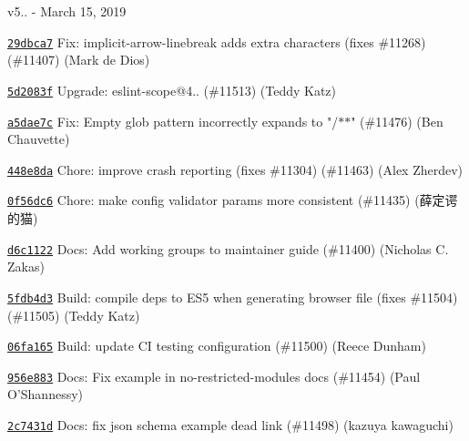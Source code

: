 v5.. -\/ March 15, 2019


\begin{DoxyItemize}
\item \href{https://github.com/eslint/eslint/commit/29dbca73d762a809adb2f457b527e144426d54a7}{\texttt{ {\ttfamily 29dbca7}}} Fix\+: implicit-\/arrow-\/linebreak adds extra characters (fixes \#11268) (\#11407) (Mark de Dios)
\item \href{https://github.com/eslint/eslint/commit/5d2083fa3e14c024197f6c386ff72237a145e258}{\texttt{ {\ttfamily 5d2083f}}} Upgrade\+: eslint-\/scope@4.. (\#11513) (Teddy Katz)
\item \href{https://github.com/eslint/eslint/commit/a5dae7c3d30231c2f5f075d98c2c8825899bab16}{\texttt{ {\ttfamily a5dae7c}}} Fix\+: Empty glob pattern incorrectly expands to "{}/\texorpdfstring{$\ast$}{*}\texorpdfstring{$\ast$}{*}"{} (\#11476) (Ben Chauvette)
\item \href{https://github.com/eslint/eslint/commit/448e8da94d09b397e98ffcb6f22b55a578ef79c1}{\texttt{ {\ttfamily 448e8da}}} Chore\+: improve crash reporting (fixes \#11304) (\#11463) (Alex Zherdev)
\item \href{https://github.com/eslint/eslint/commit/0f56dc6d9eadad05dc3d5c9d1d9ddef94e10c5d3}{\texttt{ {\ttfamily 0f56dc6}}} Chore\+: make config validator params more consistent (\#11435) (薛定谔的猫)
\item \href{https://github.com/eslint/eslint/commit/d6c112289f0f16ade070865c8786831b7940ca79}{\texttt{ {\ttfamily d6c1122}}} Docs\+: Add working groups to maintainer guide (\#11400) (Nicholas C. Zakas)
\item \href{https://github.com/eslint/eslint/commit/5fdb4d3fb01b9d8a4c2dff71ed9cddb2f8feefb0}{\texttt{ {\ttfamily 5fdb4d3}}} Build\+: compile deps to ES5 when generating browser file (fixes \#11504) (\#11505) (Teddy Katz)
\item \href{https://github.com/eslint/eslint/commit/06fa1655c3da8394ed9144d727115fc434b0416f}{\texttt{ {\ttfamily 06fa165}}} Build\+: update CI testing configuration (\#11500) (Reece Dunham)
\item \href{https://github.com/eslint/eslint/commit/956e883c21fd9f393bf6718d032a4e2e53b33f22}{\texttt{ {\ttfamily 956e883}}} Docs\+: Fix example in no-\/restricted-\/modules docs (\#11454) (Paul O’\+Shannessy)
\item \href{https://github.com/eslint/eslint/commit/2c7431d6b32063f74e3837ee727f26af215eada7}{\texttt{ {\ttfamily 2c7431d}}} Docs\+: fix json schema example dead link (\#11498) (kazuya kawaguchi)

\end{DoxyItemize}
